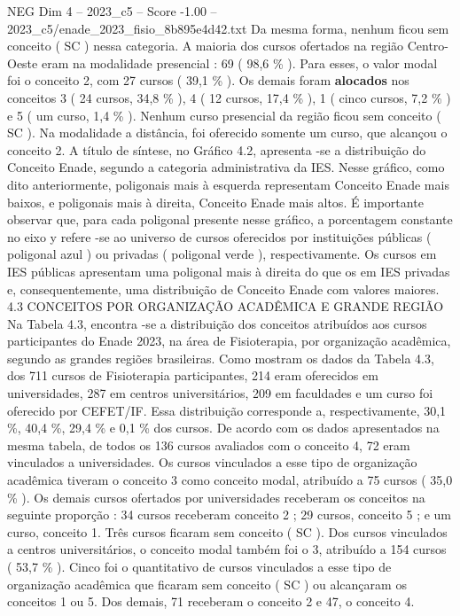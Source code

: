 \begin{textsample}{NEG Dim 4 – 2023\_c5 – Score -1.00 – 2023\_c5/enade\_2023\_fisio\_8b895e4d42.txt}
Da mesma forma, nenhum ficou sem conceito ( SC ) nessa categoria.
A maioria dos cursos ofertados na região Centro-Oeste eram na modalidade presencial : 69 ( 98,6 \% ).
Para esses, o valor modal foi o conceito 2, com 27 cursos ( 39,1 \% ).
Os demais foram \textbf{alocados} nos conceitos 3 ( 24 cursos, 34,8 \% ), 4 ( 12 cursos, 17,4 \% ), 1 ( cinco cursos, 7,2 \% ) e 5 ( um curso, 1,4 \% ).
Nenhum curso presencial da região ficou sem conceito ( SC ).
Na modalidade a distância, foi oferecido somente um curso, que alcançou o conceito 2.
A título de síntese, no Gráfico 4.2, apresenta -se a distribuição do Conceito Enade, segundo a categoria administrativa da IES.
Nesse gráfico, como dito anteriormente, poligonais mais à esquerda representam Conceito Enade mais baixos, e poligonais mais à direita, Conceito Enade mais altos.
É importante observar que, para cada poligonal presente nesse gráfico, a porcentagem constante no eixo y refere -se ao universo de cursos oferecidos por instituições públicas ( poligonal azul ) ou privadas ( poligonal verde ), respectivamente.
Os cursos em IES públicas apresentam uma poligonal mais à direita do que os em IES privadas e, consequentemente, uma distribuição de Conceito Enade com valores maiores. 4.3 CONCEITOS POR ORGANIZAÇÃO ACADÊMICA E GRANDE REGIÃO Na Tabela 4.3, encontra -se a distribuição dos conceitos atribuídos aos cursos participantes do Enade 2023, na área de Fisioterapia, por organização acadêmica, segundo as grandes regiões brasileiras.
Como mostram os dados da Tabela 4.3, dos 711 cursos de Fisioterapia participantes, 214 eram oferecidos em universidades, 287 em centros universitários, 209 em faculdades e um curso foi oferecido por CEFET/IF.
Essa distribuição corresponde a, respectivamente, 30,1 \%, 40,4 \%, 29,4 \% e 0,1 \% dos cursos.
De acordo com os dados apresentados na mesma tabela, de todos os 136 cursos avaliados com o conceito 4, 72 eram vinculados a universidades.
Os cursos vinculados a esse tipo de organização acadêmica tiveram o conceito 3 como conceito modal, atribuído a 75 cursos ( 35,0 \% ).
Os demais cursos ofertados por universidades receberam os conceitos na seguinte proporção : 34 cursos receberam conceito 2 ; 29 cursos, conceito 5 ; e um curso, conceito 1.
Três cursos ficaram sem conceito ( SC ).
Dos cursos vinculados a centros universitários, o conceito modal também foi o 3, atribuído a 154 cursos ( 53,7 \% ).
Cinco foi o quantitativo de cursos vinculados a esse tipo de organização acadêmica que ficaram sem conceito ( SC ) ou alcançaram os conceitos 1 ou 5.
Dos demais, 71 receberam o conceito 2 e 47, o conceito 4.

\end{textsample}
